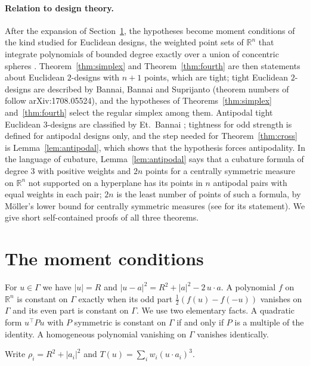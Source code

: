 \documentclass[11pt]{article}
\theoremstyle{remark}
\begin{document}
\paragraph{Relation to design theory.}
After the expansion of Section~\ref{sec:moments}, the hypotheses become moment conditions of the kind studied for Euclidean designs, the weighted point sets of $\mathbb{R}^n$ that integrate polynomials of bounded degree exactly over a union of concentric spheres \cite{NeumaierSeidel}. Theorem~\ref{thm:simplex} and Theorem~\ref{thm:fourth} are then statements about Euclidean $2$-designs with $n+1$ points, which are tight; tight Euclidean $2$-designs are described by Bannai, Bannai and Suprijanto \cite[Theorem~5.1]{BBS} (theorem numbers of \cite{BBS} follow arXiv:1708.05524), and the hypotheses of Theorems~\ref{thm:simplex} and~\ref{thm:fourth} select the regular simplex among them. Antipodal tight Euclidean $3$-designs are classified by Et.~Bannai \cite[Theorem~1.5]{EtBannai}; tightness for odd strength is defined for antipodal designs only, and the step needed for Theorem~\ref{thm:cross} is Lemma~\ref{lem:antipodal}, which shows that the hypothesis forces antipodality. In the language of cubature, Lemma~\ref{lem:antipodal} says that a cubature formula of degree $3$ with positive weights and $2n$ points for a centrally symmetric measure on $\mathbb{R}^n$ not supported on a hyperplane has its points in $n$ antipodal pairs with equal weights in each pair; $2n$ is the least number of points of such a formula, by M\"oller's lower bound for centrally symmetric measures \cite{Moller} (see \cite[Section~2]{HinrichsNovak} for its statement). We give short self-contained proofs of all three theorems.

\section{The moment conditions}\label{sec:moments}

For $u\in\Gamma$ we have $|u|=R$ and $|u-a|^2=R^2+|a|^2-2\,u\cdot a$. A polynomial $f$ on $\mathbb{R}^n$ is constant on $\Gamma$ exactly when its odd part $\frac12(f(u)-f(-u))$ vanishes on $\Gamma$ and its even part is constant on $\Gamma$. We use two elementary facts. A quadratic form $u^{\top}Pu$ with $P$ symmetric is constant on $\Gamma$ if and only if $P$ is a multiple of the identity. A homogeneous polynomial vanishing on $\Gamma$ vanishes identically.

Write $\rho_i=R^2+|a_i|^2$ and $T(u)=\sum_i w_i(u\cdot a_i)^3$.
\end{document}
